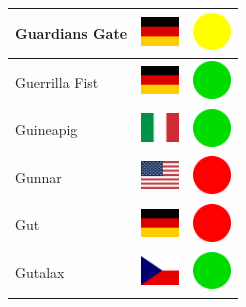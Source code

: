 \documentclass[12pt, a4paper, twoside]{report}
\begin{document}
\begin{center}
\begin{longtable}{|p{5cm}|p{2cm}|p{2cm}|}
 Guardians Gate                                             & \includegraphics[width=1cm]{../4x3/de} &   \includegraphics[width=1cm]{../likes/m} \\ \hline
 Guerrilla Fist                                             & \includegraphics[width=1cm]{../4x3/de} &   \includegraphics[width=1cm]{../likes/y} \\ \hline
 Guineapig                                                  & \includegraphics[width=1cm]{../4x3/it} &   \includegraphics[width=1cm]{../likes/y} \\ \hline
 Gunnar                                                     & \includegraphics[width=1cm]{../4x3/us} &   \includegraphics[width=1cm]{../likes/n} \\ \hline
 Gut                                                        & \includegraphics[width=1cm]{../4x3/de} &   \includegraphics[width=1cm]{../likes/n} \\ \hline
 Gutalax                                                    & \includegraphics[width=1cm]{../4x3/cz} &   \includegraphics[width=1cm]{../likes/y} \\ \hline

\end{longtable}
\end{center}
\end{document}
